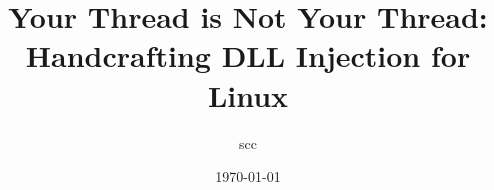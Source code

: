 \title{Your Thread is Not Your Thread: Handcrafting DLL Injection for Linux}

\author{\texorpdfstring{scc\newline{}}{scc}}
\date{\today}
